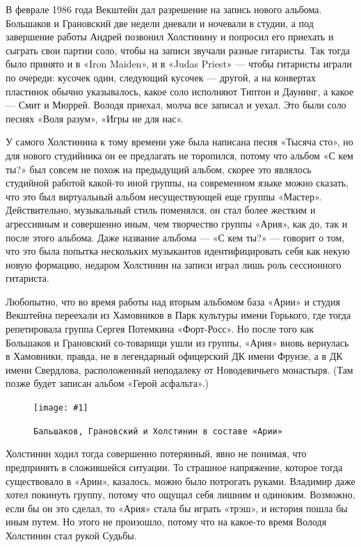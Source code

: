 \documentclass[10pt, twoside]{book}
\newcommand{\myincludegraphics}[1]{\texttt{[image: \#1]}}
\begin{document}
В феврале 1986 года Векштейн дал разрешение на запись нового альбома. Большаков и Грановский две недели дневали и
ночевали в студии, а под завершение работы Андрей позвонил Холстинину и попросил его приехать и сыграть свои партии
соло, чтобы на записи звучали разные гитаристы. Так тогда было принято и в «Iron Maiden», и в «Judas Priest» — чтобы
гитаристы играли по очереди: кусочек один, следующий кусочек — другой, а на конвертах пластинок обычно указывалось,
какое соло исполняют Типтон и Даунинг, а какое — Смит и Мюррей. Володя приехал, молча все записал и уехал. Это были соло
песнях «Воля разум», «Игры не для нас».

У самого Холстинина к тому времени уже была написана песня «Тысяча сто», но для нового студийника он ее предлагать не
торопился, потому что альбом «С кем ты?» был совсем не похож на предыдущий альбом, скорее это являлось студийной работой
какой-то иной группы, на современном языке можно сказать, что это был виртуальный альбом несуществующей еще группы
«Мастер». Действительно, музыкальный стиль поменялся, он стал более жестким и агрессивным и совершенно иным, чем
творчество группы «Ария», как до, так и после этого альбома. Даже название альбома — «С кем ты?» — говорит о том, что
это была попытка нескольких музыкантов идентифицировать себя как некую новую формацию, недаром Холстинин на записи играл
лишь роль сессионного гитариста.

Любопытно, что во время работы над вторым альбомом база «Арии» и студия Векштейна переехали из Хамовников в Парк
культуры имени Горького, где тогда репетировала группа Сергея Потемкина «Форт-Росс». Но после того как Большаков и
Грановский со-товарищи ушли из группы, «Ария» вновь вернулась в Хамовники, правда, не в легендарный офицерский ДК имени
Фрунзе, а в ДК имени Свердлова, расположенный неподалеку от Новодевичьего монастыря. (Там позже будет записан альбом
«Герой асфальта».)

\begin{figure}[h]
    \centering
    \myincludegraphics{Image15}
    \caption{\texttt{Бальшаков, Грановский и Холстинин в составе «Арии»}}
\end{figure}

Холстинин ходил тогда совершенно потерянный, явно не понимая, что предпринять в сложившейся ситуации. То страшное
напряжение, которое тогда существовало в «Арии», казалось, можно было потрогать руками. Владимир даже хотел покинуть
группу, потому что ощущал себя лишним и одиноким. Возможно, если бы он это сделал, то «Ария» стала бы играть «трэш», и
история пошла бы иным путем. Но этого не произошло, потому что на какое-то время Володя Холстинин стал рукой Судьбы.
\end{document}
